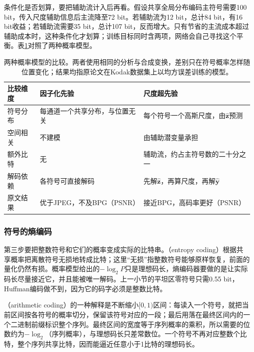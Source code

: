 条件化是否划算，要把辅助流计入后再看。假设共享全局分布编码主符号需要100 bit，传入尺度辅助信息后主流降至72 bit。若辅助流为12 bit，总计84 bit，有16 bit收益；若辅助流需要35 bit，总计107 bit，反而增大。只有节省的主流成本超过辅助成本时，这种条件化才划算；训练目标同时含两项，网络会自己寻找这个平衡。表\ref{tab:vision-entropy-model-compare}对照了两种概率模型。

\begin{table}[htbp]
 \centering
 \small
 \begin{tabularx}{\linewidth}{@{}p{16mm}XX@{}}
  \toprule
  比较维度 & 因子化先验 & 尺度超先验\\
  \midrule
  符号分布 & 每通道一个共享分布，与位置无关 & 每个符号一个高斯尺度，由$\hat{\bm{z}}$预测\\
  空间相关 & 不建模 & 由辅助潜变量承担\\
  额外比特 & 无 & 辅助流，约占主符号数的二十分之一\\
  解码依赖 & 各符号可直接解码 & 先解$\hat{\bm{z}}$，再算尺度，再解$\hat{\bm{y}}$\\
  原文结果 & 优于JPEG，不及BPG（PSNR） & 接近BPG，高码率更好（PSNR）\\
  \bottomrule
 \end{tabularx}
 \caption{两种概率模型的比较。两者使用相同的分析与合成变换，差别只在符号概率怎样随位置变化；结果均指原论文在Kodak数据集上以均方误差训练的模型。}
 \label{tab:vision-entropy-model-compare}
\end{table}

\subsubsection{符号的熵编码}
\label{sec:vision-restoration-entropy-coding}

第三步要把整数符号和它们的概率变成实际的比特串。（entropy coding）根据共享概率把离散符号无损地转成比特；这里“无损”指整数符号能够原样恢复，前面的量化仍然有损。概率模型给出的$-\log_2P$只是理想码长，熵编码器要做的是让实际码长尽量接近它，并且能被唯一解码。上一小节的平坦区零符号只需0.55 bit，Huffman编码做不到，因为它的码字必须是整数比特。

（arithmetic coding）的一种解释是不断缩小$[0,1)$区间：每读入一个符号，就把当前区间按各符号的概率切分，保留该符号对应的一段；最后用落在最终区间内的一个二进制前缀标识整个序列。最终区间的宽度等于序列概率的乘积，所以需要的位数约为$-\log_2$（序列概率），与理想码长只差常数位。一个符号不再对应整数个比特，整个序列共享比特，因而能逼近任意小于1比特的理想码长。

